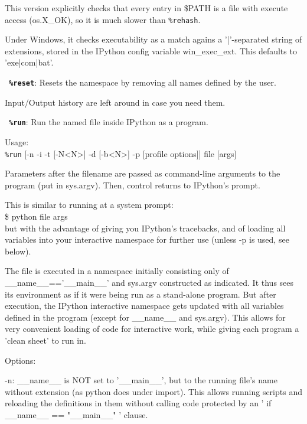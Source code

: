         This version explicitly checks that every entry in \$PATH is a file
        with execute access (os.X\_OK), so it is much slower than \texttt{\%rehash}.

        Under Windows, it checks executability as a match agains a
        '|'-separated string of extensions, stored in the IPython config
        variable win\_exec\_ext.  This defaults to 'exe|com|bat'. 

\bigskip
\texttt{\textbf{ \%reset}}:
	Resets the namespace by removing all names defined by the user.

        Input/Output history are left around in case you need them.

\bigskip
\texttt{\textbf{ \%run}}:
	Run the named file inside IPython as a program.

        Usage:\\
          \texttt{\%run} [-n -i -t [-N<N>] -d [-b<N>] -p [profile options]] file [args]
        
        Parameters after the filename are passed as command-line arguments to
        the program (put in sys.argv). Then, control returns to IPython's
        prompt.

        This is similar to running at a system prompt:\\
          \$ python file args\\
        but with the advantage of giving you IPython's tracebacks, and of
        loading all variables into your interactive namespace for further use
        (unless -p is used, see below).

        The file is executed in a namespace initially consisting only of
        \_\_name\_\_=='\_\_main\_\_' and sys.argv constructed as indicated. It thus
        sees its environment as if it were being run as a stand-alone
        program. But after execution, the IPython interactive namespace gets
        updated with all variables defined in the program (except for \_\_name\_\_
        and sys.argv). This allows for very convenient loading of code for
        interactive work, while giving each program a 'clean sheet' to run in.

        Options:
        
        -n: \_\_name\_\_ is NOT set to '\_\_main\_\_', but to the running file's name
        without extension (as python does under import).  This allows running
        scripts and reloading the definitions in them without calling code
        protected by an ' if \_\_name\_\_ == "\_\_main\_\_" ' clause.

